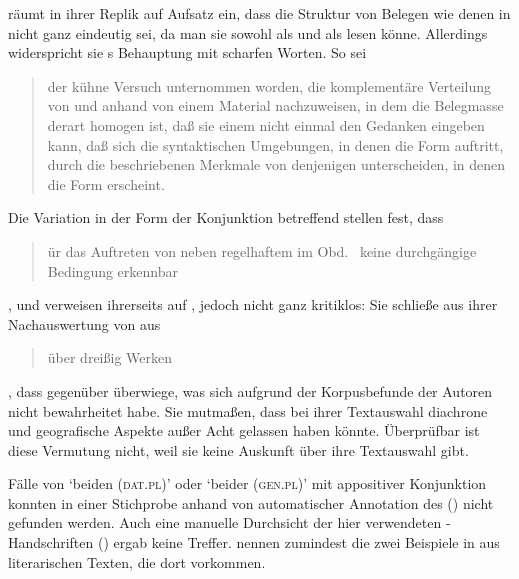 \citet[187]{gjelsten1980} räumt in ihrer Replik auf 
Aufsatz ein, dass die Struktur von Belegen wie denen in 
nicht ganz eindeutig sei, da man sie sowohl als  und als
 lesen könne. Allerdings widerspricht sie
\citeauthor{askedal1974}s Behauptung mit scharfen Worten. So sei
\blockcquote[196]{gjelsten1980}{der kühne Versuch unternommen worden, die
komplementäre Verteilung von  und  anhand von einem
Material nachzuweisen, in dem die Belegmasse derart homogen ist, daß sie einem
nicht einmal den Gedanken eingeben kann, daß sich die syntaktischen Umgebungen,
in denen die Form  auftritt, durch die beschriebenen Merkmale von
denjenigen unterscheiden, in denen die Form  erscheint.}

Die Variation in der Form der Konjunktion betreffend stellen \citet[628]{ksw2}
fest, dass \blockquote{ür das Auftreten von  neben
regelhaftem  im Obd.\ \textelp{} keine durchgängige Bedingung
erkennbar }, und verweisen ihrerseits auf \citet{gjelsten1980},
jedoch nicht ganz kritiklos: Sie schließe aus ihrer Nachauswertung von
 aus
\blockcquote[198]{gjelsten1980}{über dreißig Werken}, dass 
gegenüber  überwiege, was sich aufgrund der Korpusbefunde der
Autoren nicht bewahrheitet habe. Sie mutmaßen, dass \citeauthor{gjelsten1980}
bei ihrer Textauswahl diachrone und geografische Aspekte außer Acht gelassen
haben könnte. Überprüfbar ist diese Vermutung nicht, weil sie keine Auskunft
über ihre Textauswahl gibt.

Fälle von  `beiden (\textsc{dat.pl})' oder 
`beider (\textsc{gen.pl})' mit appositiver Konjunktion konnten in einer
Stichprobe anhand von  automatischer Annotation des
 (\CAO) nicht gefunden werden.
Auch eine manuelle Durchsicht der hier verwendeten
-Handschriften (\KC) ergab keine Treffer. \citet[626]{ksw2}
nennen zumindest die zwei Beispiele in  aus literarischen
Texten, die dort  vorkommen.

